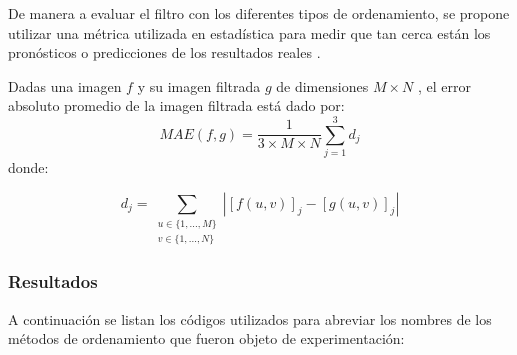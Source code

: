 De manera a evaluar el filtro con los diferentes tipos de ordenamiento, se propone utilizar una m\'etrica utilizada en estad\'istica para medir que tan cerca est\'an los pron\'osticos o predicciones de los resultados reales \cite{willmott2005advantages}.

Dadas una imagen $f$ y su imagen filtrada $g$ de dimensiones $M \times N$ , el error absoluto promedio de la imagen filtrada est\'a dado por:
\begin{equation}
\label{MAE}
MAE(f,g) = \frac{1}{3\times M\times N}\sum_{j=1}^3 d_j
\end{equation} donde: 


\begin{equation}
d_j = \sum_{\substack{u\in \{1, ..., M\}\\ v \in \{1, ..., N\}}} |[f(u,v)]_{j} - [g(u,v)]_{j}| 
\end{equation}



%
\subsubsection{Resultados}

A continuaci\'on se listan los c\'odigos utilizados para abreviar los nombres de los métodos de ordenamiento que fueron objeto de experimentación:


